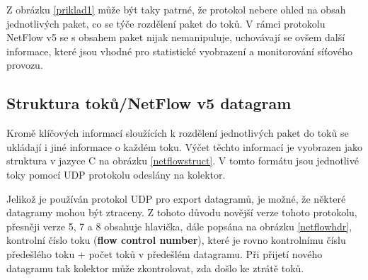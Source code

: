 \documentclass[11pt, a4paper, hidelinks]{article}[08.10.2023]
\begin{document}
    Z obrázku \ref{priklad1} může být taky patrné, že protokol nebere ohled na obsah jednotlivých paket, co se týče rozdělení paket do toků.
    V rámci protokolu NetFlow v5 se s obsahem paket nijak nemanipuluje, uchovávají se ovšem další informace, které jsou vhodné pro 
    statistické vyobrazení a monitorování síťového provozu.
    
    \subsection{Struktura toků/NetFlow v5 datagram}\label{Datagram}
    Kromě klíčových informací sloužících k rozdělení jednotlivých paket do toků se ukládají i jiné informace o každém toku.
    Výčet těchto informací je vyobrazen jako struktura v jazyce C na obrázku \ref{netflowstruct}. V tomto formátu jsou jednotlivé toky
    pomocí UDP protokolu odeslány na kolektor. 
    
    Jelikož je používán protokol UDP pro export datagramů, je možné, že některé datagramy mohou být 
    ztraceny. Z tohoto důvodu novější verze tohoto protokolu, přesněji verze 5, 7 a 8 obsahuje hlavička, dále popsána na obrázku \ref{netflowhdr}, kontrolní číslo toku (\textbf{flow control number}), které je 
    rovno kontrolnímu číslu předešlého toku + počet toků v předešlém datagramu. Při přijetí nového datagramu tak kolektor může zkontrolovat, zda došlo 
    ke ztrátě toků\cite{Cisco_datagram}\cite{IBM_header}.
\end{document}
